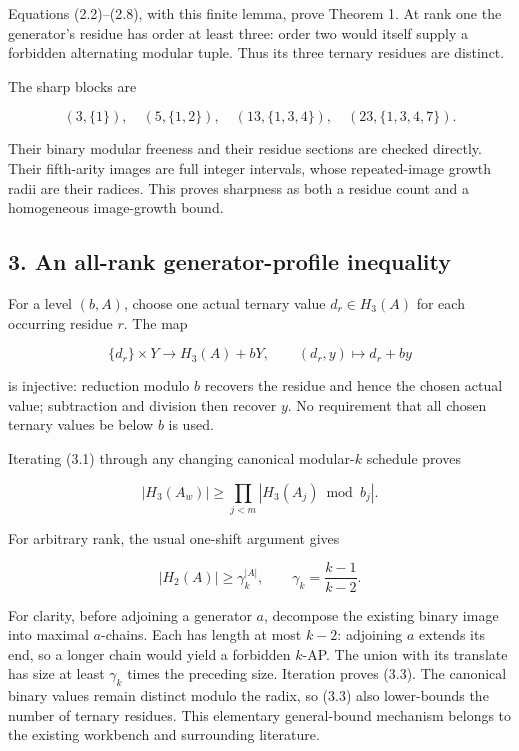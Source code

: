 Equations (2.2)--(2.8), with this finite lemma, prove Theorem 1. At rank one the generator's residue has order at least three: order two would itself supply a forbidden alternating modular tuple. Thus its three ternary residues are distinct.

The sharp blocks are

\[
(3,\{1\}),\quad(5,\{1,2\}),\quad
(13,\{1,3,4\}),\quad(23,\{1,3,4,7\}).
\tag{2.9}
\]

Their binary modular freeness and their residue sections are checked directly. Their fifth-arity images are full integer intervals, whose repeated-image growth radii are their radices. This proves sharpness as both a residue count and a homogeneous image-growth bound.

\subsection{3. An all-rank generator-profile inequality}\label{eporig:an-all-rank-generator-profile-inequality}

For a level \((b,A)\), choose one actual ternary value \(d_r\in H_3(A)\) for each occurring residue \(r\). The map

\[
\{d_r\}\times Y\longrightarrow H_3(A)+bY,
\qquad(d_r,y)\longmapsto d_r+by
\tag{3.1}
\]

is injective: reduction modulo \(b\) recovers the residue and hence the chosen actual value; subtraction and division then recover \(y\). No requirement that all chosen ternary values be below \(b\) is used.

Iterating (3.1) through any changing canonical modular-\(k\) schedule proves

\[
|H_3(A_w)|\ge\prod_{j<m}|H_3(A_j)\bmod b_j|.
\tag{3.2}
\]

For arbitrary rank, the usual one-shift argument gives

\[
|H_2(A)|\ge\gamma_k^{|A|},\qquad
\gamma_k=\frac{k-1}{k-2}.
\tag{3.3}
\]

For clarity, before adjoining a generator \(a\), decompose the existing binary image into maximal \(a\)-chains. Each has length at most \(k-2\): adjoining \(a\) extends its end, so a longer chain would yield a forbidden \(k\)-AP. The union with its translate has size at least \(\gamma_k\) times the preceding size. Iteration proves (3.3). The canonical binary values remain distinct modulo the radix, so (3.3) also lower-bounds the number of ternary residues. This elementary general-bound mechanism belongs to the existing workbench and surrounding literature.

